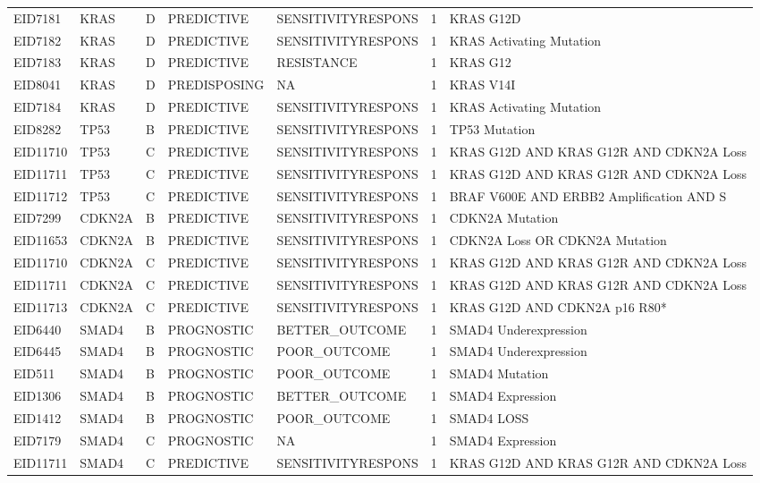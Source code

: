 \begin{footnotesize}
\begin{longtable}{llllllp{4.2cm}}
EID7181 & KRAS & D & PREDICTIVE & SENSITIVITYRESPONS & 1 & KRAS G12D \\
EID7182 & KRAS & D & PREDICTIVE & SENSITIVITYRESPONS & 1 & KRAS Activating Mutation \\
EID7183 & KRAS & D & PREDICTIVE & RESISTANCE & 1 & KRAS G12 \\
EID8041 & KRAS & D & PREDISPOSING & NA & 1 & KRAS V14I \\
EID7184 & KRAS & D & PREDICTIVE & SENSITIVITYRESPONS & 1 & KRAS Activating Mutation \\
EID8282 & TP53 & B & PREDICTIVE & SENSITIVITYRESPONS & 1 & TP53 Mutation \\
EID11710 & TP53 & C & PREDICTIVE & SENSITIVITYRESPONS & 1 & KRAS G12D AND KRAS G12R AND CDKN2A Loss  \\
EID11711 & TP53 & C & PREDICTIVE & SENSITIVITYRESPONS & 1 & KRAS G12D AND KRAS G12R AND CDKN2A Loss  \\
EID11712 & TP53 & C & PREDICTIVE & SENSITIVITYRESPONS & 1 & BRAF V600E AND ERBB2 Amplification AND S \\
EID7299 & CDKN2A & B & PREDICTIVE & SENSITIVITYRESPONS & 1 & CDKN2A Mutation \\
EID11653 & CDKN2A & B & PREDICTIVE & SENSITIVITYRESPONS & 1 & CDKN2A Loss OR CDKN2A Mutation \\
EID11710 & CDKN2A & C & PREDICTIVE & SENSITIVITYRESPONS & 1 & KRAS G12D AND KRAS G12R AND CDKN2A Loss  \\
EID11711 & CDKN2A & C & PREDICTIVE & SENSITIVITYRESPONS & 1 & KRAS G12D AND KRAS G12R AND CDKN2A Loss  \\
EID11713 & CDKN2A & C & PREDICTIVE & SENSITIVITYRESPONS & 1 & KRAS G12D AND CDKN2A p16 R80* \\
EID6440 & SMAD4 & B & PROGNOSTIC & BETTER\_OUTCOME & 1 & SMAD4 Underexpression \\
EID6445 & SMAD4 & B & PROGNOSTIC & POOR\_OUTCOME & 1 & SMAD4 Underexpression \\
EID511 & SMAD4 & B & PROGNOSTIC & POOR\_OUTCOME & 1 & SMAD4 Mutation \\
EID1306 & SMAD4 & B & PROGNOSTIC & BETTER\_OUTCOME & 1 & SMAD4 Expression \\
EID1412 & SMAD4 & B & PROGNOSTIC & POOR\_OUTCOME & 1 & SMAD4 LOSS \\
EID7179 & SMAD4 & C & PROGNOSTIC & NA & 1 & SMAD4 Expression \\
EID11711 & SMAD4 & C & PREDICTIVE & SENSITIVITYRESPONS & 1 & KRAS G12D AND KRAS G12R AND CDKN2A Loss  \\

\end{longtable}
\end{footnotesize}
